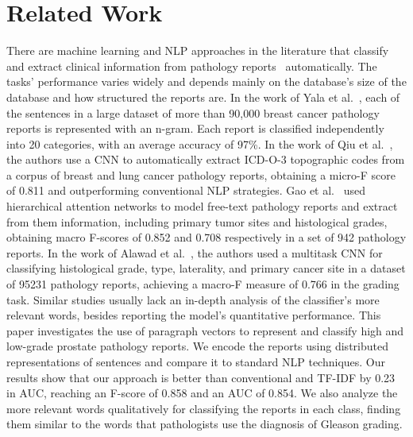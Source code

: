 \documentclass[runningheads]{llncs}
\begin{document}
\section{Related Work}
%
There are machine learning and NLP approaches in the literature that classify and extract clinical information from pathology reports~\cite{GYQ2018} automatically. The tasks' performance varies widely and depends mainly on the database's size of the database and how structured the reports are.
In the work of Yala et al.~\cite{YBS2017}, each of the sentences in a large dataset of more than 90,000 breast cancer pathology reports is represented with an n-gram. Each report is classified independently into 20 categories, with an average accuracy of 97\%.
In the work of Qiu et al.~\cite{QYF2017}, the authors use a CNN to automatically extract ICD-O-3 topographic codes from a corpus of breast and lung cancer pathology reports, obtaining a micro-F score of 0.811 and outperforming conventional NLP strategies. 
Gao et al.~\cite{GYQ2018} used hierarchical attention networks to model free-text pathology reports and extract from them information, including primary tumor sites and histological grades, obtaining macro F-scores of 0.852 and 0.708 respectively in a set of 942 pathology reports.
In the work of Alawad et al.~\cite{AGQ2020}, the authors used a multitask CNN for classifying histological grade, type, laterality, and primary cancer site in a dataset of 95231 pathology reports, achieving a macro-F measure of 0.766 in the grading task. 
Similar studies usually lack an in-depth analysis of the classifier's more relevant words, besides reporting the model's quantitative performance. 
This paper investigates the use of paragraph vectors to represent and classify high and low-grade prostate pathology reports.
We encode the reports using distributed representations of sentences and compare it to standard NLP techniques. Our results show that our approach is better than conventional and TF-IDF by 0.23 in AUC, reaching an F-score of 0.858 and an AUC of 0.854. We also analyze the more relevant words qualitatively for classifying the reports in each class, finding them similar to the words that pathologists use the diagnosis of Gleason grading. %
%
\end{document}
